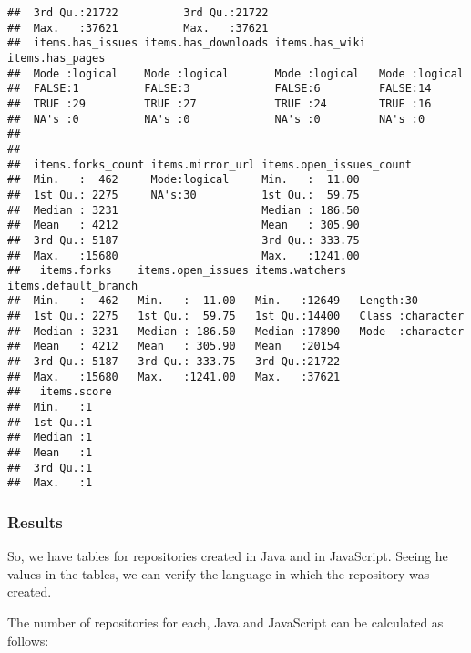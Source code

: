 \documentclass{article}\usepackage[]{graphicx}\usepackage[]{color}
\makeatletter
\newenvironment{kframe}{%
 \def\at@end@of@kframe{}%
 \ifinner\ifhmode%
  \def\at@end@of@kframe{\end{minipage}}%
  \begin{minipage}{\columnwidth}%
 \fi\fi%
 \def\FrameCommand##1{\hskip\@totalleftmargin \hskip-\fboxsep
 \colorbox{shadecolor}{##1}\hskip-\fboxsep
     \hskip-\linewidth \hskip-\@totalleftmargin \hskip\columnwidth}%
 \MakeFramed {\advance\hsize-\width
   \@totalleftmargin\z@ \linewidth\hsize
   \@setminipage}}%
 {\par\unskip\endMakeFramed%
 \at@end@of@kframe}
\newenvironment{knitrout}{}{} %
\makeatother
\begin{document}
\begin{knitrout}
\begin{kframe}
\begin{verbatim}
##  3rd Qu.:21722          3rd Qu.:21722                          
##  Max.   :37621          Max.   :37621                          
##  items.has_issues items.has_downloads items.has_wiki  items.has_pages
##  Mode :logical    Mode :logical       Mode :logical   Mode :logical  
##  FALSE:1          FALSE:3             FALSE:6         FALSE:14       
##  TRUE :29         TRUE :27            TRUE :24        TRUE :16       
##  NA's :0          NA's :0             NA's :0         NA's :0        
##                                                                      
##                                                                      
##  items.forks_count items.mirror_url items.open_issues_count
##  Min.   :  462     Mode:logical     Min.   :  11.00        
##  1st Qu.: 2275     NA's:30          1st Qu.:  59.75        
##  Median : 3231                      Median : 186.50        
##  Mean   : 4212                      Mean   : 305.90        
##  3rd Qu.: 5187                      3rd Qu.: 333.75        
##  Max.   :15680                      Max.   :1241.00        
##   items.forks    items.open_issues items.watchers  items.default_branch
##  Min.   :  462   Min.   :  11.00   Min.   :12649   Length:30           
##  1st Qu.: 2275   1st Qu.:  59.75   1st Qu.:14400   Class :character    
##  Median : 3231   Median : 186.50   Median :17890   Mode  :character    
##  Mean   : 4212   Mean   : 305.90   Mean   :20154                       
##  3rd Qu.: 5187   3rd Qu.: 333.75   3rd Qu.:21722                       
##  Max.   :15680   Max.   :1241.00   Max.   :37621                       
##   items.score
##  Min.   :1   
##  1st Qu.:1   
##  Median :1   
##  Mean   :1   
##  3rd Qu.:1   
##  Max.   :1
\end{verbatim}
\end{kframe}
\end{knitrout}

\subsubsection*{Results}
So, we have tables for repositories created in Java and in JavaScript. Seeing he values in the tables, we can verify the language in which the repository was created. \par
The number of repositories for each, Java and JavaScript can be calculated as follows:
\end{document}
